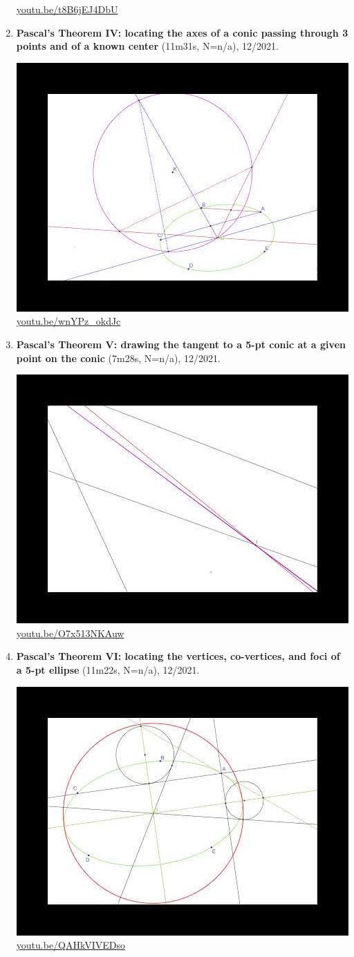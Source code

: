 \documentclass[12pt]{amsart}
\begin{document}
\begin{enumerate}[resume]
\begin{center}
\href{https://youtu.be/t8B6jEJ4DbU}{\url{youtu.be/t8B6jEJ4DbU}}\end{center}
% 
\item \textbf{Pascal's Theorem IV: locating the axes of a conic passing through 3 points and of a known center} (11m31s, N=n/a), 12/2021. 
\begin{center}\includegraphics[width=.5\textwidth]{pics/wnYPz_okdJc.jpg} \\ 
\href{https://youtu.be/wnYPz_okdJc}{\url{youtu.be/wnYPz\_okdJc}}\end{center}
% 
\item \textbf{Pascal's Theorem V: drawing the tangent to a 5-pt conic at a given point on the conic} (7m28s, N=n/a), 12/2021. 
\begin{center}\includegraphics[width=.5\textwidth]{pics/O7x513NKAuw.jpg} \\ 
\href{https://youtu.be/O7x513NKAuw}{\url{youtu.be/O7x513NKAuw}}\end{center}
% 
\item \textbf{Pascal's Theorem VI: locating the vertices, co-vertices, and foci of a 5-pt ellipse} (11m22s, N=n/a), 12/2021. 
\begin{center}\includegraphics[width=.5\textwidth]{pics/QAHkVIVEDso.jpg} \\ 
\href{https://youtu.be/QAHkVIVEDso}{\url{youtu.be/QAHkVIVEDso}}\end{center}
% 
\end{enumerate}
\end{document}
